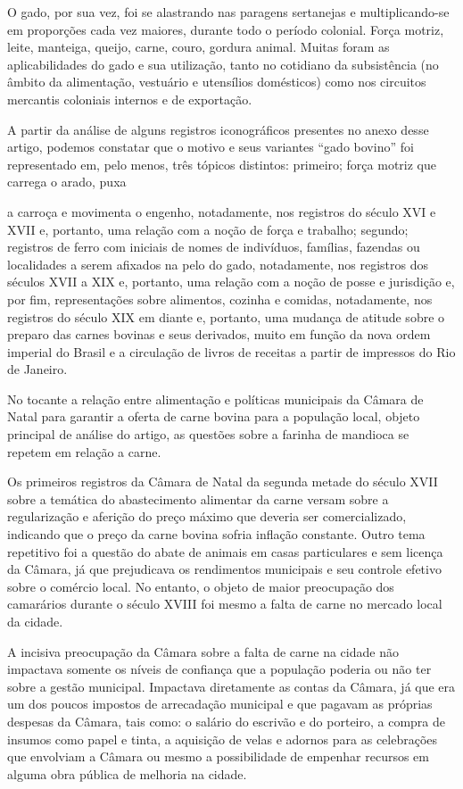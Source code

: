 \begin{refsection}
O gado, por sua vez, foi se alastrando nas paragens sertanejas e multiplicando-se em proporções cada vez maiores, durante todo o período colonial. Força motriz, leite, manteiga, queijo, carne, couro, gordura animal. Muitas foram as aplicabilidades do gado e sua utilização, tanto no cotidiano da subsistência (no âmbito da alimentação, vestuário e utensílios domésticos) como nos circuitos mercantis coloniais internos e de exportação.

A partir da análise de alguns registros iconográficos presentes no anexo desse artigo, podemos constatar que o motivo e seus variantes ``gado bovino'' foi representado em, pelo menos, três tópicos distintos: primeiro; força motriz que carrega o arado, puxa

a carroça e movimenta o engenho, notadamente, nos registros do século XVI e XVII e, portanto, uma relação com a noção de força e trabalho; segundo; registros de ferro com iniciais de nomes de indivíduos, famílias, fazendas ou localidades a serem afixados na pelo do gado, notadamente, nos registros dos séculos XVII a XIX e, portanto, uma relação com a noção de posse e jurisdição e, por fim, representações sobre alimentos, cozinha e comidas, notadamente, nos registros do século XIX em diante e, portanto, uma mudança de atitude sobre o preparo das carnes bovinas e seus derivados, muito em função da nova ordem imperial do Brasil e a circulação de livros de receitas a partir de impressos do Rio de Janeiro.

No tocante a relação entre alimentação e políticas municipais da Câmara de Natal para garantir a oferta de carne bovina para a população local, objeto principal de análise do artigo, as questões sobre a farinha de mandioca se repetem em relação a carne.

Os primeiros registros da Câmara de Natal da segunda metade do século XVII sobre a temática do abastecimento alimentar da carne versam sobre a regularização e aferição do preço máximo que deveria ser comercializado, indicando que o preço da carne bovina sofria inflação constante. Outro tema repetitivo foi a questão do abate de animais em casas particulares e sem licença da Câmara, já que prejudicava os rendimentos municipais e seu controle efetivo sobre o comércio local. No entanto, o objeto de maior preocupação dos camarários durante o século XVIII foi mesmo a falta de carne no mercado local da cidade.

A incisiva preocupação da Câmara sobre a falta de carne na cidade não impactava somente os níveis de confiança que a população poderia ou não ter sobre a gestão municipal. Impactava diretamente as contas da Câmara, já que era um dos poucos impostos de arrecadação municipal e que pagavam as próprias despesas da Câmara, tais como: o salário do escrivão e do porteiro, a compra de insumos como papel e tinta, a aquisição de velas e adornos para as celebrações que envolviam a Câmara ou mesmo a possibilidade de empenhar recursos em alguma obra pública de melhoria na cidade.


\end{refsection}
